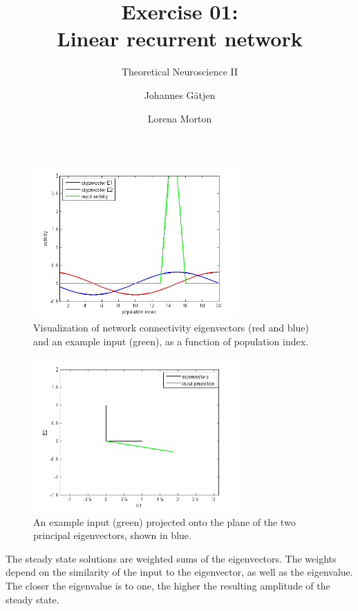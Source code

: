 \documentclass{scrartcl}
\title{Exercise 01:\\Linear recurrent network}
\subtitle{Theoretical Neuroscience II}
\author{Johannes G\"atjen \and Lorena Morton}
\begin{document}
\maketitle
\begin{figure}[h]
\centering
\includegraphics[trim = {0.6cm 0 1.2cm 0.7cm}, width=0.7\textwidth, clip]{../pics/eigen}
\caption{Visualization of network connectivity eigenvectors (red and blue) and an example input (green), as a function of population index.}
\label{label}
\end{figure}

\begin{figure}[h]
\centering
\includegraphics[trim = {0.6cm 0 1.2cm 0.7cm}, width=0.7\textwidth, clip]{../pics/input}
\caption{An example input (green) projected onto the plane of the two principal eigenvectors, shown in blue.}
\label{label}
\end{figure}

The steady state solutions are weighted sums of the eigenvectors. The weights depend on the similarity of the input to the eigenvector, as well as the eigenvalue. The closer the eigenvalue is to one, the higher the resulting amplitude of the steady state.
\end{document}
